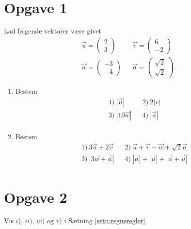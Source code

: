 \section*{Opgave 1}
Lad følgende vektorer være givet
\begin{align*}
&\vec{u} = \begin{pmatrix}
2\\3
\end{pmatrix}&&\vec{v} = \begin{pmatrix}
6 \\ -2
\end{pmatrix}\\
&\vec{w} = \begin{pmatrix}
-3\\-4 
\end{pmatrix}
&& \vec{a} = \begin{pmatrix}
\sqrt{2} \\ \sqrt{2}
\end{pmatrix}.
\end{align*}
\begin{enumerate}[label=\roman*)]
\item Bestem 
\begin{align*}
&1) \ |\vec{u}|  &&2) \  2|v|   \\
&3) \ |10\vec{w}|  &&4) \  |\vec{a}|    \\
\end{align*}
\item Bestem 
\begin{align*}
&1) \ 3\vec{u}+2\vec{v}   &&2) \ \vec{u}+ \vec{v} - \vec{w} +\sqrt{2}\vec{a}  \\
&3) \ |3\vec{w}+\vec{a}|  &&4) \ |\vec{a}| + |\vec{u}| + |\vec{a}+\vec{u}|  \\
\end{align*}
\end{enumerate}
\section*{Opgave 2}
Vis $i)$, $ii)$, $iv)$ og $v)$ i Sætning \ref{setn:regneregler}.
